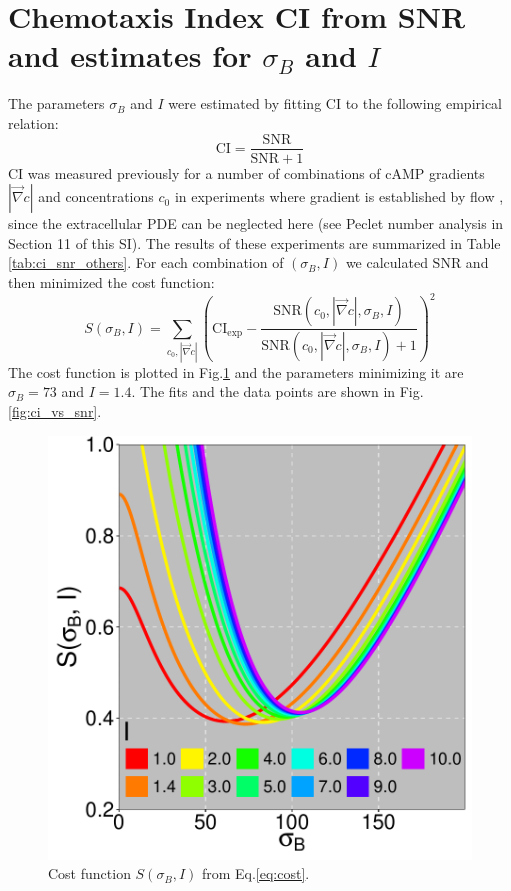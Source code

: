 \documentclass[10pt]{article}
\begin{document}
\section{Chemotaxis Index CI from SNR and estimates for $\sigma_B$ and $I$}


The parameters $\sigma_B$ and $I$ were estimated by fitting CI to the following empirical relation:
\begin{equation}
	\mathrm{CI} = \frac{\mathrm{SNR}}{\mathrm{SNR} + 1}
	\label{eq:ci_fit}
\end{equation}
CI was measured previously for a number of combinations of cAMP gradients $|\vec{\nabla}c|$ and concentrations $c_0$ in experiments where gradient is established by flow \cite{song, eberhard1, fuller-1}, since the extracellular PDE can be neglected here (see Peclet number analysis in Section 11 of this SI). The results of these experiments are summarized in Table \ref{tab:ci_snr_others}. For each combination of $(\sigma_B, I)$ we calculated $\mathrm{SNR}$ and then minimized the cost function:
\begin{equation}
	S(\sigma_B, I) = \sum_{c_0, |\vec{\nabla}c|} \left(\mathrm{CI_{exp}} - \frac{\mathrm{SNR}(c_0, |\vec{\nabla}c|, \sigma_B, I)}{\mathrm{SNR}(c_0, |\vec{\nabla}c|, \sigma_B, I) + 1} \right)^2
	\label{eq:cost}
\end{equation}
The cost function is plotted in Fig.\ref{fig:ci_cost} and the parameters minimizing it are $\sigma_B = 73$ and $I = 1.4$. The fits and the data points are shown in Fig.\ref{fig:ci_vs_snr}.
\begin{figure}[ht]
	\centering
	\includegraphics[scale=0.3]{../figures/si_ci_snr_cost_min}
	\caption{Cost function $S(\sigma_B, I)$ from Eq.\ref{eq:cost}.}
	\label{fig:ci_cost}
\end{figure}
\end{document}
